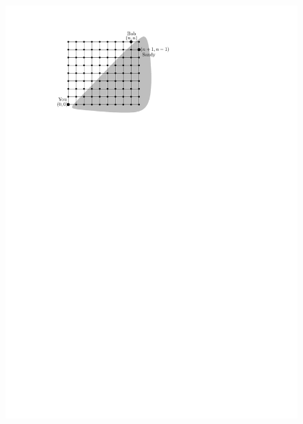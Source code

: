 \documentclass[12pt]{article}
\begin{document}
\begin{enumerate}[(a)]
        \begin{figure}[h!]
            \centering
            \includegraphics[page=2]{flooded} \hspace{0.1cm}

\end{figure}
\end{enumerate}
\end{document}
